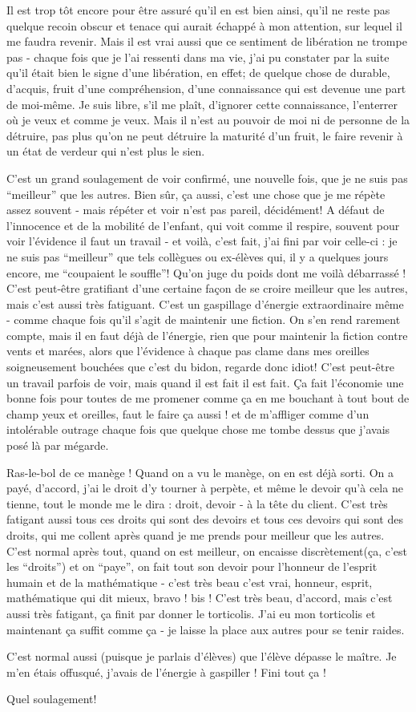 Il est trop tôt encore pour être assuré qu'il en est bien ainsi, qu'il ne reste pas quelque recoin obscur et tenace qui aurait échappé à mon attention, sur lequel il me faudra revenir. Mais il est vrai aussi que ce sentiment de libération ne trompe pas - chaque fois que je l'ai ressenti dans ma vie, j'ai pu constater par la suite qu'il était bien le signe d'une libération, en effet; de quelque chose de durable, d'acquis, fruit d'une compréhension, d'une connaissance qui est devenue une part de moi-même. Je suis libre, s'il me plaît, d'ignorer cette connaissance, l'enterrer où je veux et comme je veux. Mais il n'est au pouvoir de moi ni de personne de la détruire, pas plus qu'on ne peut détruire la maturité d'un fruit, le faire revenir à un état de verdeur qui n'est plus le sien.

C'est un grand soulagement de voir confirmé, une nouvelle fois, que je ne suis pas ``meilleur'' que les autres. Bien sûr, ça aussi, c'est une chose que je me répète assez souvent - mais répéter et voir n'est pas pareil, décidément! A défaut de l'innocence et de la mobilité de l'enfant, qui voit comme il respire, souvent pour voir l'évidence il faut un travail - et voilà, c'est fait, j'ai fini par voir celle-ci : je ne suis pas ``meilleur'' que tels collègues ou ex-élèves qui, il y a quelques jours encore, me ``coupaient le souffle''! Qu'on juge du poids dont me voilà débarrassé ! C'est peut-être gratifiant d'une certaine façon de se croire meilleur que les autres, mais c'est aussi très fatiguant. C'est un gaspillage d'énergie extraordinaire même - comme chaque fois qu'il s'agit de maintenir une fiction. On s'en rend rarement compte, mais il en faut déjà de l'énergie, rien que pour maintenir la fiction contre vents et marées, alors que l'évidence à chaque pas clame dans mes oreilles soigneusement bouchées que c'est du bidon, regarde donc idiot! C'est peut-être un travail parfois de voir, mais quand il est fait il est fait. Ça fait l'économie une bonne fois pour toutes de me promener comme ça en me bouchant à tout bout de champ yeux et oreilles, faut le faire ça aussi ! et de m'affliger comme d'un intolérable outrage chaque fois que quelque chose me tombe dessus que j'avais posé là par mégarde.

Ras-le-bol de ce manège ! Quand on a vu le manège, on en est déjà sorti. On a payé, d'accord, j'ai le droit d'y tourner à perpète, et même le devoir qu'à cela ne tienne, tout le monde me le dira : droit, devoir - à la tête du client. C'est très fatigant aussi tous ces droits qui sont des devoirs et tous ces devoirs qui sont des droits, qui me collent après quand je me prends pour meilleur que les autres. C'est normal après tout, quand on est meilleur, on encaisse discrètement(ça, c'est les ``droits'') et on ``paye'', on fait tout son devoir pour l'honneur de l'esprit humain et de la mathématique - c'est très beau c'est vrai, honneur, esprit, mathématique qui dit mieux, bravo ! bis ! C'est très beau, d'accord, mais c'est aussi très fatigant, ça finit par donner le torticolis. J'ai eu mon torticolis et maintenant ça suffit comme ça - je laisse la place aux autres pour se tenir raides.

C'est normal aussi (puisque je parlais d'élèves) que l'élève dépasse le maître. Je m'en étais offusqué, j'avais de l'énergie à gaspiller ! Fini tout ça !

Quel soulagement!

